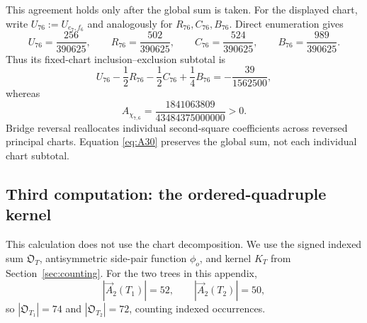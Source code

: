 This agreement holds only after the global sum is taken.  For the displayed
chart, write
$U_{76}:=U_{e_7,f_6}$ and analogously for $R_{76},C_{76},B_{76}$.  Direct
enumeration gives
\[
 U_{76}=\frac{256}{390625},\qquad
 R_{76}=\frac{502}{390625},\qquad
 C_{76}=\frac{524}{390625},\qquad
 B_{76}=\frac{989}{390625}.
\]
Thus its fixed-chart inclusion--exclusion subtotal is
\[
 U_{76}-\frac12R_{76}-\frac12C_{76}+\frac14B_{76}
 =-\frac{39}{1562500},
\]
whereas
\[
 A_{\chi_{7,6}}=\frac{1841063809}{43484375000000}>0.
\]
Bridge reversal reallocates individual second-square coefficients across
reversed principal charts.  Equation \eqref{eq:A30} preserves the global sum,
not each individual chart subtotal.

\subsection{Third computation: the ordered-quadruple kernel}

This calculation does not use the chart decomposition.  We use the signed
indexed sum $\mathfrak O_T$, antisymmetric side-pair function $\phi_o$, and
kernel $K_T$ from Section~\ref{sec:counting}.  For
the two trees in this appendix,
\[
 |\overrightarrow A_2(T_1)|=52,
 \qquad
 |\overrightarrow A_2(T_2)|=50,
\]
so $|\mathfrak O_{T_1}|=74$ and $|\mathfrak O_{T_2}|=72$, counting
indexed occurrences.

